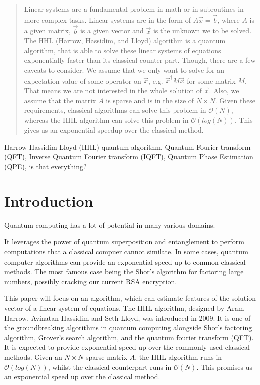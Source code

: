 


\begin{abstract}
Linear systems are a fundamental problem in math or in subroutines in more complex tasks.
Linear systems are in the form of $A \vec x = \vec b$, where $A$ is a given matrix, $\vec b$ is a given vector and $\vec x$ is the unknown we to be solved.
The HHL (Harrow, Hassidim, and Lloyd) algorithm is a quantum algorithm, that is able to solve these linear systems of equations exponentially faster than its classical counter part. 
Though, there are a few caveats to consider.
We assume that we only want to solve for an expectation value of some operator on $\vec x$, e.g. $\vec{x}^\dagger M \vec x$ for some matrix $M$.
That means we are not interested in the whole solution of $\vec x$.
Also, we assume that the matrix $A$ is sparse and is in the size of $N\times N$. 
Given these requirements, classical algorithms can solve this problem in $\mathcal{O}(N )$, whereas the HHL algorithm can solve this problem in $\mathcal{O}(log (N) )$.
This gives us an exponential speedup over the classical method.
\end{abstract}

\begin{IEEEkeywords}
Harrow-Hassidim-Lloyd (HHL) quantum algorithm, 
Quantum Fourier transform (QFT), 
Inverse Quantum Fourier transform (IQFT), 
Quantum Phase Estimation (QPE),
is that everything?
\end{IEEEkeywords}




\begin{comment}
- breakthrough
- tremendous progress
- practical qubits
- 
\end{comment}


\section{Introduction}


Quantum computing has a lot of potential in many various domains. 

It leverages the power of quantum superposition and entanglement to perform computations that a classical compuer cannot similate.
In some cases, quantum computer algorithms can provide an exponential speed up to common classical methods.
The most famous case being the Shor's algorithm for factoring large numbers, possibly cracking our current RSA encryption.

This paper will focus on an algorithm, which can estimate features of the solution vector of a linear system of equations.
The HHL algorithm, designed by Aram Harrow, Avinatan Hassidim and Seth Lloyd, was introduced in 2009. 
It is one of the groundbreaking algorithms in quantum computing alongside Shor's factoring algorithm, Grover's search algorithm, and the quantum fourier transform (QFT).
It is expected to provide exponential speed up over the commonly used classical methods. 
Given an $N \times N$ sparse matrix $A$, the HHL algorithm runs in $\mathcal{O} (log (N))$, whilst the classical counterpart runs in $\mathcal{O} (N)$.
This promises us an exponential speed up over the classical method.

